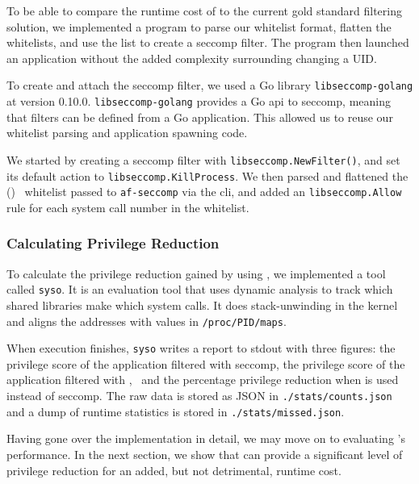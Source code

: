 To be able to compare the runtime cost of \af to the current gold standard
filtering solution, we implemented a program to parse our whitelist format,
flatten the whitelists, and use the list to create a seccomp filter. The program
then launched an application without the added complexity surrounding changing
a UID.

To create and attach the seccomp filter, we used a Go library 
\texttt{libseccomp-golang} at version 0.10.0. \texttt{libseccomp-golang}
provides a Go \ac{api} to seccomp, meaning that filters can be defined from a
Go application. This allowed us to reuse our whitelist parsing and application
spawning code.

We started by creating a seccomp filter with \texttt{libseccomp.NewFilter()}, 
and set its default action to \texttt{libseccomp.KillProcess}. We then parsed
and flattened the (\afss)~ whitelist passed to \texttt{af-seccomp} via the
\ac{cli}, and added an \texttt{libseccomp.Allow} rule for each system call number in
the whitelist.

\subsubsection{Calculating Privilege Reduction}

To calculate the privilege reduction gained by using \af, we implemented a
tool called \texttt{syso}. It is an evaluation tool that uses dynamic analysis
to track which shared libraries make which system calls. It does
stack-unwinding in the kernel and aligns the addresses with values in
\texttt{/proc/PID/maps}. 

When execution finishes, \texttt{syso} writes a report to \ac{stdout} with three
figures: the privilege score of the application filtered with seccomp, the
privilege score of the application filtered with \afss,~ and the percentage
privilege reduction when \af is used instead of seccomp. The raw data is stored
as JSON in \texttt{./stats/counts.json} and a dump of runtime statistics is
stored in \texttt{./stats/missed.json}.

Having gone over the implementation in detail, we may move on to evaluating
\af's performance. In the next section, we show that \af can provide a
significant level of privilege reduction for an added, but not detrimental,
runtime cost.

